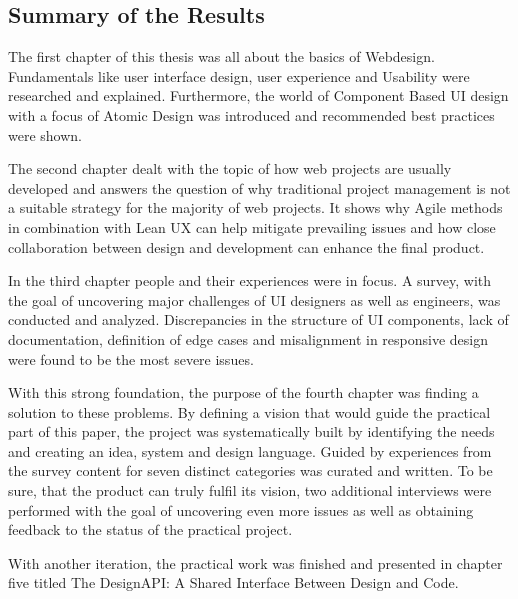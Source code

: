 \newpage
\subsection{Summary of the Results}
The first chapter of this thesis was all about the basics of Webdesign. Fundamentals like user
interface design, user experience and Usability were researched and explained. Furthermore, the
world of Component Based UI design with a focus of Atomic Design was introduced and recommended best
practices were shown.

The second chapter dealt with the topic of how web projects are usually developed and answers the
question of why traditional project management is not a suitable strategy for the majority of
web projects. It shows why Agile methods in combination with Lean UX can help mitigate prevailing
issues and how close collaboration between design and development can enhance the final product. 

In the third chapter people and their experiences were in focus. A survey, with the goal of
uncovering major challenges of UI designers as well as engineers, was conducted and analyzed.
Discrepancies in the structure of UI components, lack of documentation, definition of edge cases and
misalignment in responsive design were found to be the most severe issues.

With this strong foundation, the purpose of the fourth chapter was finding a solution to these
problems. By defining a vision that would guide the practical part of this paper, the project was
systematically built by identifying the needs and creating an idea, system and design language.
Guided by experiences from the survey content for seven distinct categories was curated and written.
To be sure, that the product can truly fulfil its vision, two additional interviews were performed
with the goal of uncovering even more issues as well as obtaining feedback to the status of the
practical project. 

With another iteration, the practical work was finished and presented in chapter five titled The
DesignAPI: A Shared Interface Between Design and Code. 